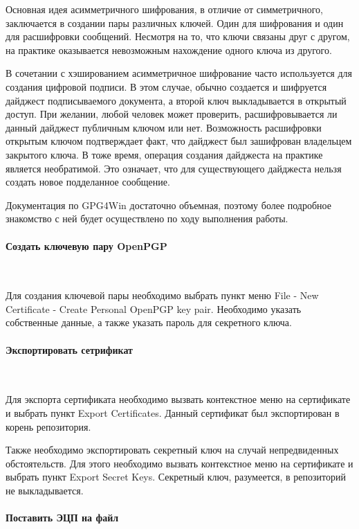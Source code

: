 \documentclass{article}
\begin{document}
Основная идея асимметричного шифрования, в отличие от симметричного, заключается в создании пары различных ключей. Один для шифрования и один для расшифровки сообщений. Несмотря на то, что ключи связаны друг с другом, на практике оказывается невозможным нахождение одного ключа из другого.

В сочетании с хэшированием асимметричное шифрование часто используется для создания цифровой подписи. В этом случае, обычно создается и шифруется дайджест подписываемого документа, а второй ключ выкладывается в открытый доступ. При желании, любой человек может проверить, расшифровывается ли данный дайджест публичным ключом или нет. Возможность расшифровки открытым ключом подтверждает факт, что дайджест был зашифрован владельцем закрытого ключа. В тоже время, операция создания дайджеста на практике является необратимой. Это означает, что для существующего дайджеста нельзя создать новое подделанное сообщение.

Документация по GPG4Win достаточно объемная, поэтому более подробное знакомство с ней будет осуществлено по ходу выполнения работы.

\paragraph{Создать ключевую пару OpenPGP} 
~

Для создания ключевой пары необходимо выбрать пункт меню File - New Certificate - Create Personal OpenPGP key pair. Необходимо указать собственные данные, а также указать пароль для секретного ключа.

\paragraph{Экспортировать сетрификат}
~

Для экспорта сертификата необходимо вызвать контекстное меню на сертификате и выбрать пункт Export Certificates. Данный сертификат был экспортирован в корень репозитория.

Также необходимо экспортировать секретный ключ на случай непредвиденных обстоятельств. Для этого необходимо вызвать контекстное меню на сертификате и выбрать пункт Export Secret Keys. Секретный ключ, разумеется, в репозиторий не выкладывается.

\paragraph{Поставить ЭЦП на файл}
~
\end{document}
